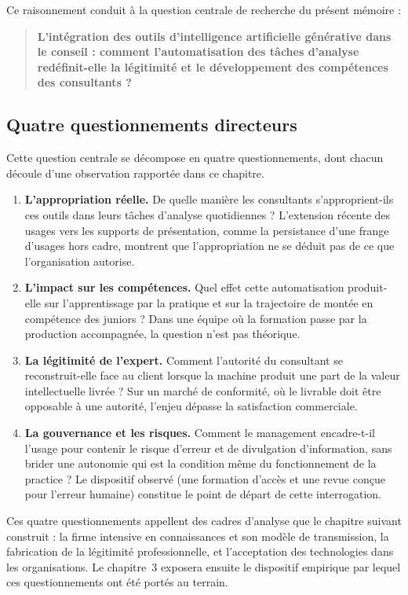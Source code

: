 Ce raisonnement conduit à la question centrale de recherche du présent mémoire :

\begin{quote}
\textbf{L'intégration des outils d'intelligence artificielle générative dans le conseil :
comment l'automatisation des tâches d'analyse redéfinit-elle la légitimité et le
développement des compétences des consultants ?}
\end{quote}

\subsection{Quatre questionnements directeurs}

Cette question centrale se décompose en quatre questionnements, dont chacun découle d'une
observation rapportée dans ce chapitre.

\begin{enumerate}
  \item \textbf{L'appropriation réelle.} De quelle manière les consultants s'approprient-ils
    ces outils dans leurs tâches d'analyse quotidiennes ? L'extension récente des usages
    vers les supports de présentation, comme la persistance d'une frange d'usages hors
    cadre, montrent que l'appropriation ne se déduit pas de ce que l'organisation autorise.
  \item \textbf{L'impact sur les compétences.} Quel effet cette automatisation produit-elle
    sur l'apprentissage par la pratique et sur la trajectoire de montée en compétence des
    juniors ? Dans une équipe où la formation passe par la production accompagnée, la
    question n'est pas théorique.
  \item \textbf{La légitimité de l'expert.} Comment l'autorité du consultant se
    reconstruit-elle face au client lorsque la machine produit une part de la valeur
    intellectuelle livrée ? Sur un marché de conformité, où le livrable doit être opposable
    à une autorité, l'enjeu dépasse la satisfaction commerciale.
  \item \textbf{La gouvernance et les risques.} Comment le management encadre-t-il l'usage
    pour contenir le risque d'erreur et de divulgation d'information, sans brider une
    autonomie qui est la condition même du fonctionnement de la practice ? Le dispositif
    observé (une formation d'accès et une revue conçue pour l'erreur humaine) constitue le
    point de départ de cette interrogation.
\end{enumerate}

Ces quatre questionnements appellent des cadres d'analyse que le chapitre suivant
construit : la firme intensive en connaissances et son modèle de transmission, la
fabrication de la légitimité professionnelle, et l'acceptation des technologies dans les
organisations. Le chapitre~3 exposera ensuite le dispositif empirique par lequel ces
questionnements ont été portés au terrain.